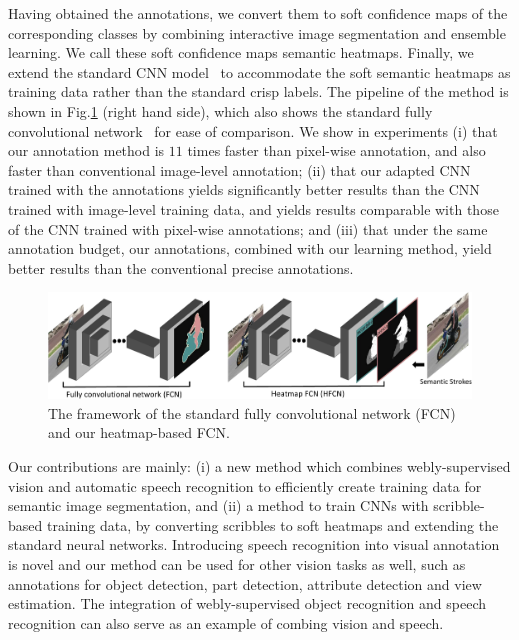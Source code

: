 \documentclass[runningheads]{llncs}
\begin{document}
Having obtained the annotations, we convert them to soft confidence
maps of the corresponding classes by combining interactive image
segmentation and ensemble learning. We call these soft confidence maps semantic heatmaps.
Finally, we extend the standard CNN model~\citep{Long_2015_CVPR} to
accommodate the soft semantic heatmaps as training data rather than the
standard crisp labels.  The pipeline of the method is shown in
Fig.\ref{fig:2} (right hand side), which also shows the standard fully
convolutional network~\citep{Long_2015_CVPR} for ease of comparison. We
show in experiments (i) that our annotation method is $11$ times faster than
pixel-wise annotation, and also faster than
conventional image-level annotation; (ii) that our adapted CNN trained with the
annotations yields significantly better results than the CNN trained
with image-level training data, and yields results comparable with
those of the CNN trained with pixel-wise annotations; and (iii) that under the same annotation budget, our annotations, combined with our learning method, yield better results than the conventional precise annotations.
 
 \begin{figure}[!tb]
\centering
\includegraphics[width=0.95\linewidth]{fig2/figure2-crop.pdf}
\caption{The framework of the standard fully convolutional network
  (FCN)~\citep{Long_2015_CVPR} and our heatmap-based FCN.}
\label{fig:2} \vspace{-3mm}
\end{figure}

Our contributions are mainly: (i) a new method which combines webly-supervised vision and automatic speech recognition to efficiently create training data for semantic image segmentation,
and (ii) a method to train CNNs with scribble-based training data, by converting scribbles to soft heatmaps and extending the standard neural networks. 
Introducing speech recognition into visual annotation is novel and 
our method can be used for other vision tasks as well, such as annotations for object detection, part detection, attribute detection and view estimation. The integration of webly-supervised object recognition and speech recognition can also serve as an example of combing vision and speech. 
\end{document}
